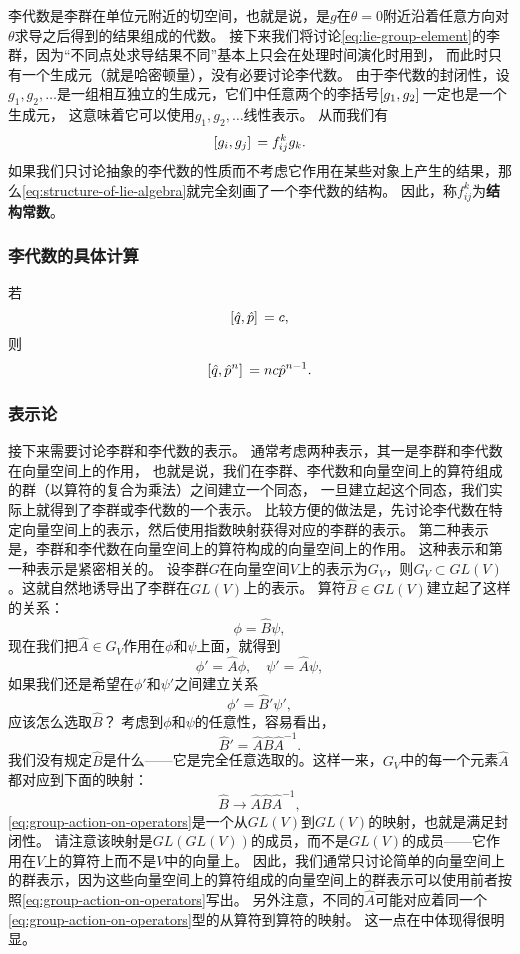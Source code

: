 \documentclass[hyperref, UTF8, a4paper]{ctexart}
\renewcommand{\autoref}{\prettyref}
\begin{document}
李代数是李群在单位元附近的切空间，也就是说，是$g$在$\theta=0$附近沿着任意方向对$\theta$求导之后得到的结果组成的代数。
接下来我们将讨论\eqref{eq:lie-group-element}的李群，因为“不同点处求导结果不同”基本上只会在处理时间演化时用到，
而此时只有一个生成元（就是哈密顿量），没有必要讨论李代数。
由于李代数的封闭性，设$g_1, g_2, \ldots$是一组相互独立的生成元，它们中任意两个的李括号$\comm*{g_1}{g_2}$一定也是一个生成元，
这意味着它可以使用$g_1, g_2, \ldots$线性表示。
从而我们有
\begin{equation}
    \comm*{g_i}{g_j} = f_{ij}^k g_k.
    \label{eq:structure-of-lie-algebra}
\end{equation}
如果我们只讨论抽象的李代数的性质而不考虑它作用在某些对象上产生的结果，那么\eqref{eq:structure-of-lie-algebra}就完全刻画了一个李代数的结构。
因此，称$f_{ij}^k$为\textbf{结构常数}。

\subsubsection{李代数的具体计算}

若
\[
    \comm*{\hat{q}}{\hat{p}} = c,
\]
则
\[
    \comm*{\hat{q}}{\hat{p}^n} = n c \hat{p}^{n-1}.
\]

\subsubsection{表示论}\label{sec:rep-th}

接下来需要讨论李群和李代数的表示。
通常考虑两种表示，其一是李群和李代数在向量空间上的作用，
也就是说，我们在李群、李代数和向量空间上的算符组成的群（以算符的复合为乘法）之间建立一个同态，
一旦建立起这个同态，我们实际上就得到了李群或李代数的一个表示。
比较方便的做法是，先讨论李代数在特定向量空间上的表示，然后使用指数映射获得对应的李群的表示。
第二种表示是，李群和李代数在向量空间上的算符构成的向量空间上的作用。
这种表示和第一种表示是紧密相关的。
设李群$G$在向量空间$V$上的表示为$G_V$，则$G_V \subset GL(V)$。这就自然地诱导出了李群在$GL(V)$上的表示。
算符$\hat{B} \in GL(V)$建立起了这样的关系：
\[
    \phi = \hat{B} \psi,
\]
现在我们把$\hat{A} \in G_V$作用在$\phi$和$\psi$上面，就得到
\[
    \phi' = \hat{A} \phi, \quad \psi' = \hat{A} \psi,
\]
如果我们还是希望在$\phi'$和$\psi'$之间建立关系
\[
    \phi' = \hat{B}' \psi',
\]
应该怎么选取$\hat{B}$？
考虑到$\phi$和$\psi$的任意性，容易看出，
\[
    \hat{B}' = \hat{A} \hat{B} \hat{A}^{-1}.
\]
我们没有规定$\hat{B}$是什么——它是完全任意选取的。这样一来，$G_V$中的每一个元素$\hat{A}$都对应到下面的映射：
\begin{equation}
    \hat{B} \longrightarrow \hat{A} \hat{B} \hat{A}^{-1},
    \label{eq:group-action-on-operators}
\end{equation}
\eqref{eq:group-action-on-operators}是一个从$GL(V)$到$GL(V)$的映射，也就是满足封闭性。
请注意该映射是$GL(GL(V))$的成员，而不是$GL(V)$的成员——它作用在$V$上的算符上而不是$V$中的向量上。
因此，我们通常只讨论简单的向量空间上的群表示，因为这些向量空间上的算符组成的向量空间上的群表示可以使用前者按照\eqref{eq:group-action-on-operators}写出。
另外注意，不同的$\hat{A}$可能对应着同一个\eqref{eq:group-action-on-operators}型的从算符到算符的映射。
这一点在\autoref{sec:rotation}中体现得很明显。
\end{document}
